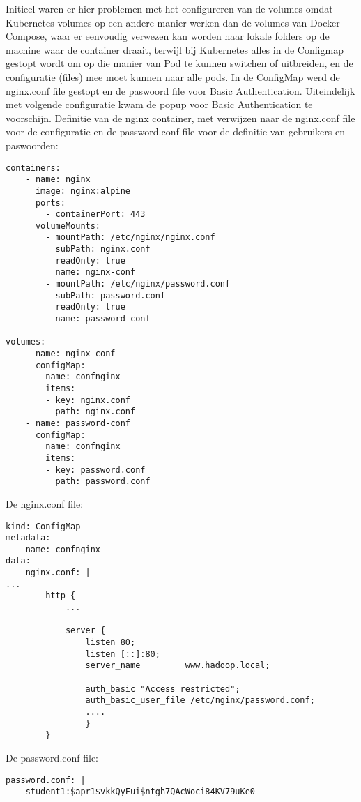 Initieel waren er hier problemen met het configureren van de volumes omdat Kubernetes volumes op een andere manier werken dan de volumes van Docker Compose, waar er eenvoudig verwezen kan worden naar lokale folders op de machine waar de container draait, terwijl bij Kubernetes alles in de Configmap gestopt wordt om op die manier van Pod te kunnen switchen of uitbreiden, en de configuratie (files) mee moet kunnen naar alle pods.
\newline
\newline
In de ConfigMap werd de nginx.conf file gestopt en de paswoord file voor Basic Authentication.
Uiteindelijk met volgende configuratie kwam de popup voor Basic Authentication te voorschijn.
\newpage
Definitie van de nginx container, met verwijzen naar de nginx.conf file voor de configuratie en de password.conf file voor de definitie van gebruikers en paswoorden:
\newline
\begin{lstlisting}
containers:
    - name: nginx
      image: nginx:alpine
      ports:
        - containerPort: 443
      volumeMounts:
        - mountPath: /etc/nginx/nginx.conf
          subPath: nginx.conf
          readOnly: true
          name: nginx-conf
        - mountPath: /etc/nginx/password.conf
          subPath: password.conf
          readOnly: true
          name: password-conf

volumes:
    - name: nginx-conf
      configMap:
        name: confnginx
        items:
        - key: nginx.conf
          path: nginx.conf
    - name: password-conf
      configMap:
        name: confnginx
        items:
        - key: password.conf
          path: password.conf
\end{lstlisting}

De nginx.conf file:
\begin{lstlisting}
kind: ConfigMap
metadata:
    name: confnginx
data:
    nginx.conf: |
...
        http {
            ...

            server {
                listen 80;
                listen [::]:80;
                server_name         www.hadoop.local;
                
                auth_basic "Access restricted";
                auth_basic_user_file /etc/nginx/password.conf;
                ....
                }
        }
\end{lstlisting}

De password.conf file:
\begin{lstlisting}
password.conf: |
    student1:$apr1$vkkQyFui$ntgh7QAcWoci84KV79uKe0
    
\end{lstlisting}


